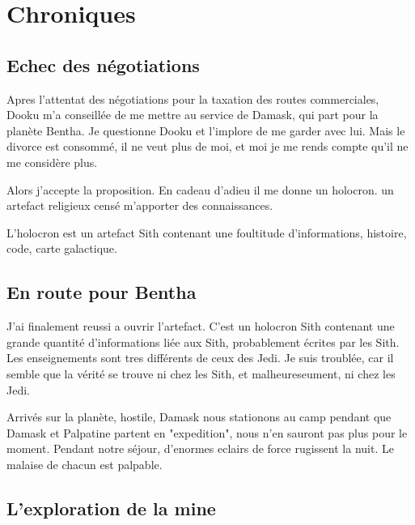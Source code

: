 \documentclass[10pt,a4paper,twoside,twocolumn,openany]{book}
\begin{document}
\chapter{Chroniques}


\section{Echec des négotiations}

Apres l'attentat des négotiations pour la taxation des routes commerciales, Dooku m'a conseillée de me mettre au service de Damask, qui part pour la planète Bentha. Je questionne Dooku et l'implore de me garder avec lui. Mais le divorce est consommé, il ne veut plus de moi, et moi je me rends compte qu'il ne me considère plus.

Alors j'accepte la proposition. En cadeau d'adieu il me donne un holocron. un artefact religieux censé m'apporter des connaissances.

\begin{quotebox}
L'holocron est un artefact Sith contenant une foultitude d'informations, histoire, code, 
carte galactique.
\end{quotebox}

\section{En route pour Bentha} 

J'ai finalement reussi a ouvrir l'artefact. C'est un holocron Sith contenant
une grande quantité d'informations liée aux Sith, probablement écrites par les Sith.
Les enseignements sont tres différents de ceux des Jedi.
Je suis troublée, car il semble que la vérité se trouve ni chez les Sith, et malheureseument, ni chez les Jedi.

Arrivés sur la planète, hostile, Damask nous stationons au camp pendant que Damask
et Palpatine partent en "expedition", nous n'en sauront pas plus pour le moment.
Pendant notre séjour, d'enormes eclairs de force rugissent la nuit. Le malaise de chacun est palpable.

\section{L'exploration de la mine}
\end{document}
